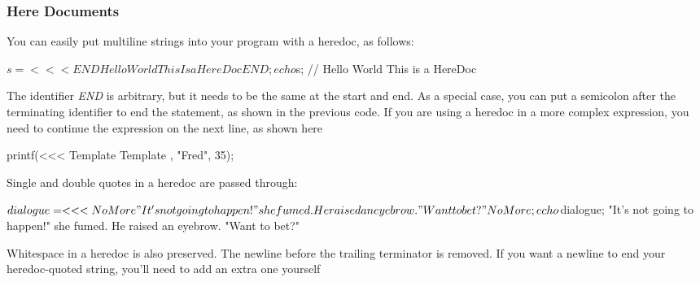 \documentclass{report}
\begin{document}
\bigbreak \noindent 
\subsubsection{Here Documents}
\bigbreak \noindent 
You can easily put multiline strings into your program with a heredoc, as follows:
\bigbreak \noindent 
\begin{phpcode}
    $s = <<< END
        Hello
        World
        This
        Is a 
        HereDoc
        END;

    echo $s; // Hello World This is a HereDoc
\end{phpcode}
\bigbreak \noindent 
The identifier \textit{END} is arbitrary, but it needs to be the same at the start and end.
\bigbreak \noindent 
As a special case, you can put a semicolon after the terminating identifier to end the
statement, as shown in the previous code. If you are using a heredoc in a more complex
expression, you need to continue the expression on the next line, as shown here
\bigbreak \noindent 
\begin{phpcode}
    printf(<<< Template
    Template
    , "Fred", 35);
\end{phpcode}

\bigbreak \noindent 
Single and double quotes in a heredoc are passed through:
\bigbreak \noindent 
\begin{phpcode}
    $dialogue = <<< NoMore
    "It's not going to happen!" she fumed.
    He raised an eyebrow. "Want to bet?"
    NoMore;
    echo $dialogue;
    "It's not going to happen!" she fumed.
    He raised an eyebrow. "Want to bet?"
\end{phpcode}
\bigbreak \noindent 
Whitespace in a heredoc is also preserved. The newline before the trailing terminator is removed. If you want a newline to end your heredoc-quoted string, you’ll need to add an extra one yourself
\bigbreak \noindent 
{}

\bigbreak \noindent 
\end{document}
